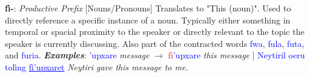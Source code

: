 \textbf{fì-}: \textit{Productive Prefix} [Nouns/Pronouns] Translates to "This (noun)".  Used to directly reference a specific instance of a noun.  Typically either something in temporal or spacial proximity to the speaker or directly relevant to the topic the speaker is currently discussing.  Also part of the contracted words \textcolor{Blue}{fwa}, \textcolor{Blue}{fula}, \textcolor{Blue}{futa}, and \textcolor{Blue}{furia}. \textit{\textbf{Examples}}: \textcolor{Blue}{'upxare}\textit{ message} $\rightarrow$ \textcolor{Red}{fì}\textcolor{Blue}{'upxare}\textit{ this message} | \textcolor{Blue}{Neytiril oeru tolìng \underline{fì'upxaret}}\textit{ Neytiri gave this message to me.}\par